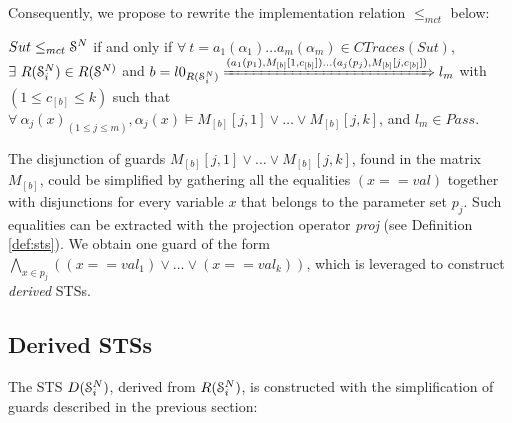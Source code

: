 Consequently, we propose to rewrite the implementation relation
$\leq_{mct}$ below:

\begin{proposition}
    ${Sut} \leq_{mct} \EuScript{S}^{N}$ if and only if
    $\forall ~t = a_1(\alpha_1) \dots a_m(\alpha_m) \in
    CTraces({Sut})$, $\exists ~R(\EuScript{S}_i^{N}) \in
    R(\EuScript{S}^{N)}$ and
    $b = l0_{R(\EuScript{S}_i^{N})}
    \xRightarrow{(a_1(p_1),M_{[b]}[1,c_{[b]}]) \dots (a_j(p_j),M_{[b]}[j,c_{[b]}])}
    l_m$
    with $(1 \leq c_{[b]} \leq k)$ such that $\forall
    ~\alpha_j(x)_{(1 \leq j \leq m)}, \alpha_j(x) \models
    M_{[b]}[j,1] \vee \dots \vee  M_{[b]}[j,k]$, and $l_m \in Pass$.
\end{proposition}

The disjunction of guards $M_{[b]}[j,1] \vee \dots \vee
M_{[b]}[j,k]$, found in the matrix $M_{[b]}$, could be simplified
by gathering all the equalities $(x == val)$ together with
disjunctions for every variable $x$ that belongs to the parameter
set $p_j$. Such equalities can be extracted with the projection
operator \textit{proj} (see Definition \ref{def:sts}). We obtain
one guard of the form $\displaystyle \bigwedge_{x \in p_j} ((x ==
val_1) \vee \dots \vee (x == val_k))$, which is leveraged to
construct \emph{derived} STSs.

\subsection{Derived STSs}

The STS $D(\EuScript{S}_i^{N})$, derived from
$R(\EuScript{S}_i^{N})$, is constructed with the simplification
of guards described in the previous section:

